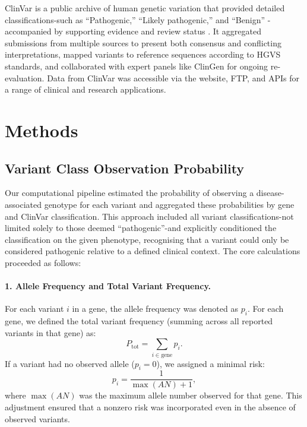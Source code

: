 ClinVar is a public archive of human genetic variation that provided detailed classifications-such as ``Pathogenic,'' ``Likely pathogenic,'' and ``Benign'' -accompanied by supporting evidence and review status \cite{landrum_clinvar_2018}. It aggregated submissions from multiple sources to present both consensus and conflicting interpretations, mapped variants to reference sequences according to HGVS standards, and collaborated with expert panels like ClinGen for ongoing re-evaluation. Data from ClinVar was accessible via the website, FTP, and APIs for a range of clinical and research applications.




\section{Methods}
\subsection{Variant Class Observation Probability}

Our computational pipeline estimated the probability of observing a disease-associated genotype for each variant and aggregated these probabilities by gene and ClinVar classification. This approach included all variant classifications-not limited solely to those deemed “pathogenic”-and explicitly conditioned the classification on the given phenotype, recognising that a variant could only be considered pathogenic relative to a defined clinical context. The core calculations proceeded as follows:

\paragraph{1. Allele Frequency and Total Variant Frequency.}
For each variant \(i\) in a gene, the allele frequency was denoted as \(p_i\). For each gene, we defined the total variant frequency (summing across all reported variants in that gene) as:
\[
P_{\text{tot}} = \sum_{i \in \text{gene}} p_i.
\]
If a variant had no observed allele (\(p_i = 0\)), we assigned a minimal risk:
\[
p_i = \frac{1}{\max(AN) + 1},
\]
where \(\max(AN)\) was the maximum allele number observed for that gene. This adjustment ensured that a nonzero risk was incorporated even in the absence of observed variants.
